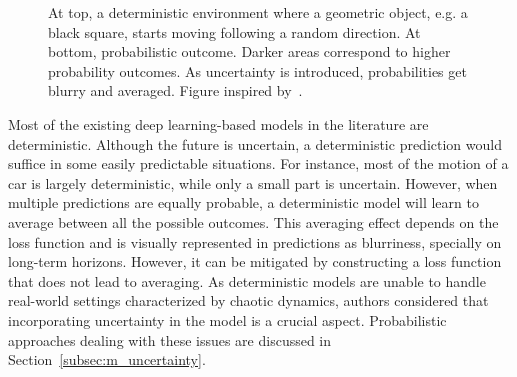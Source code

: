 \begin{figure}[!hbt]
	\centering
	\resizebox{0.8\textwidth}{!}{
		
	}
	\caption{At top, a deterministic environment where a geometric object, e.g. a black square, starts moving following a random direction. At bottom, probabilistic outcome. Darker areas correspond to higher probability outcomes. As uncertainty is introduced, probabilities get blurry and averaged. Figure inspired by~\cite{Babaeizadeh2018}.}
	\label{fig:deterministic}
\end{figure}

Most of the existing deep learning-based models in the literature are deterministic. Although the future is uncertain, a deterministic prediction would suffice in some easily predictable situations. For instance, most of the motion of a car is largely deterministic, while only a small part is uncertain. However, when multiple predictions are equally probable, a deterministic model will learn to average between all the possible outcomes. This averaging effect depends on the loss function and is visually represented in predictions as blurriness, specially on long-term horizons. However, it can be mitigated by constructing a loss function that does not lead to averaging. As deterministic models are unable to handle real-world settings characterized by chaotic dynamics, authors considered that incorporating uncertainty in the model is a crucial aspect. Probabilistic approaches dealing with these issues are discussed in Section~\ref{subsec:m_uncertainty}.


